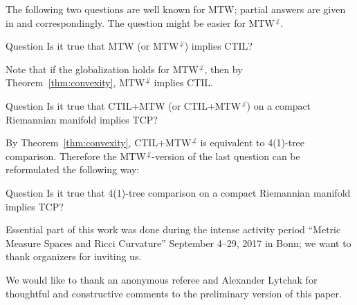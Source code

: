 The following two questions are well known for MTW;
partial answers are given in \cite{MTW+CTIL+} and \cite{loeper} correspondingly.
The question might be easier for MTW$^{\not\perp}$.

\begin{thm}{Question}
Is it true that MTW (or MTW$^{\not\perp}$) implies CTIL?
\end{thm}

Note that if the globalization holds for MTW$^{\not\perp}$, then by Theorem~\ref{thm:convexity}, MTW$^{\not\perp}$ implies CTIL.

\begin{thm}{Question}
Is it true that CTIL+MTW (or CTIL+MTW$^{\not\perp}$) on a compact Riemannian manifold implies TCP?
\end{thm}

By Theorem~\ref{thm:convexity}, CTIL+MTW$^{\not\perp}$ is equivalent to 4(1)-tree comparison. 
Therefore the MTW$^{\not\perp}$-version of the last question can be reformulated the following way:

\begin{thm}{Question} Is it true that 4(1)-tree comparison on a compact Riemannian manifold implies TCP?
\end{thm}

 Essential part of this work was done during the intense activity period ``Metric Measure Spaces and Ricci Curvature'' September 4--29, 2017 in Bonn; we want to thank organizers for inviting us.

We would like to thank an anonymous referee and Alexander Lytchak for thoughtful and constructive comments to the preliminary version of this paper. 
